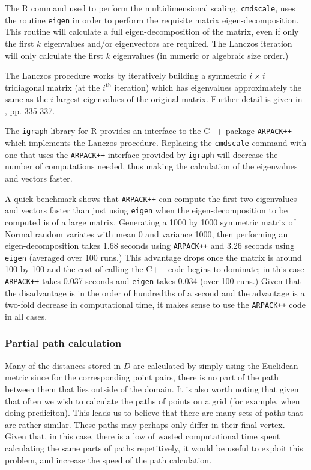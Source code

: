 The \textsf{R} command used to perform the multidimensional scaling, \texttt{cmdscale}, uses the routine \texttt{eigen} in order to perform the requisite matrix eigen-decomposition. This routine will calculate a full eigen-decomposition of the matrix, even if only the first $k$ eigenvalues and/or eigenvectors are required. The Lanczos iteration will only calculate the first $k$ eigenvalues (in numeric or algebraic size order.)

The  Lanczos procedure works by iteratively building a symmetric $i\times i$ tridiagonal matrix (at the $i^{\text{th}}$ iteration) which has eigenvalues approximately the same as the $i$ largest eigenvalues of the original matrix. Further detail is given in \cite{simonbook}, pp. 335-337.

The \texttt{igraph} library for \textsf{R} provides an interface to the C++ package \texttt{ARPACK++} which implements the Lanczos procedure. Replacing the \texttt{cmdscale} command with one that uses the \texttt{ARPACK++} interface provided by \texttt{igraph} will decrease the number of computations needed, thus making the calculation of the eigenvalues and vectors faster.

A quick benchmark shows that \texttt{ARPACK++} can compute the first two eigenvalues and vectors faster than just using \texttt{eigen} when the eigen-decomposition to be computed is of a large matrix. Generating a 1000 by 1000 symmetric matrix of Normal random variates with mean 0 and variance 1000, then performing an eigen-decomposition takes 1.68 seconds using \texttt{ARPACK++} and 3.26 seconds using \texttt{eigen} (averaged over 100 runs.) This advantage drops once the matrix is around 100 by 100 and the cost of calling the C++ code begins to dominate; in this case \texttt{ARPACK++} takes 0.037 seconds and \texttt{eigen} takes 0.034 (over 100 runs.) Given that the disadvantage is in the order of hundredths of a second and the advantage is a two-fold decrease in computational time, it makes sense to use the \texttt{ARPACK++} code in all cases.


\subsubsection{Partial path calculation}

Many of the distances stored in $D$ are calculated by simply using the Euclidean metric since for the corresponding point pairs, there is no part of the path between them that lies outside of the domain. It is also worth noting that given that often we wish to calculate the paths of points on a grid (for example, when doing prediciton). This leads us to believe that there are many sets of paths that are rather similar. These paths may perhaps only differ in their final vertex. Given that, in this case, there is a low of wasted computational time spent calculating the same parts of paths repetitively, it would be useful to exploit this problem, and increase the speed of the path calculation.


